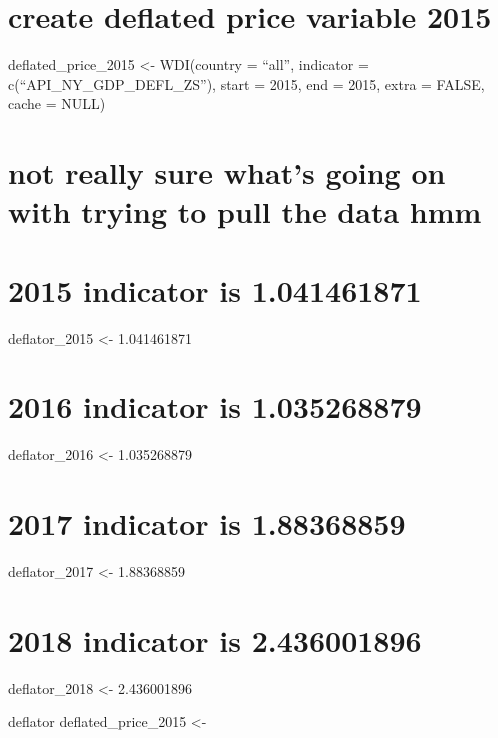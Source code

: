 \documentclass[
]{article}
\begin{document}
\hypertarget{create-deflated-price-variable-2015}{%
\section{create deflated price variable
2015}\label{create-deflated-price-variable-2015}}

deflated\_price\_2015 \textless- WDI(country = ``all'', indicator =
c(``API\_NY\_GDP\_DEFL\_ZS''), start = 2015, end = 2015, extra = FALSE,
cache = NULL)

\hypertarget{not-really-sure-whats-going-on-with-trying-to-pull-the-data-hmm}{%
\section{not really sure what's going on with trying to pull the data
hmm}\label{not-really-sure-whats-going-on-with-trying-to-pull-the-data-hmm}}

\hypertarget{indicator-is-1.041461871}{%
\section{2015 indicator is 1.041461871}\label{indicator-is-1.041461871}}

deflator\_2015 \textless- 1.041461871

\hypertarget{indicator-is-1.035268879}{%
\section{2016 indicator is 1.035268879}\label{indicator-is-1.035268879}}

deflator\_2016 \textless- 1.035268879

\hypertarget{indicator-is-1.88368859}{%
\section{2017 indicator is 1.88368859}\label{indicator-is-1.88368859}}

deflator\_2017 \textless- 1.88368859

\hypertarget{indicator-is-2.436001896}{%
\section{2018 indicator is 2.436001896}\label{indicator-is-2.436001896}}

deflator\_2018 \textless- 2.436001896

deflator deflated\_price\_2015 \textless-
\end{document}
